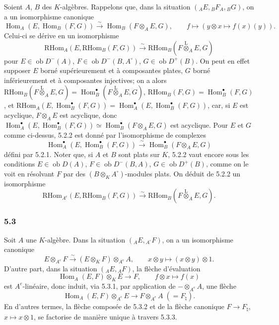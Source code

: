 \documentclass[11pt]{article}
\DeclareMathOperator{\Hom}{Hom}
\newcommand{\ob}{\operatorname{ob}}
\providecommand{\RHom}{\mathrm{RHom}}
\providecommand{\lten}{\overset{\mathrm L}{\otimes}}
\providecommand{\RHom}{\mathrm{RHom}}
\providecommand{\Hom}{\operatorname{Hom}}
\providecommand{\ob}{\operatorname{ob}}
\providecommand{\lten}{\overset{\mathrm L}{\otimes}}
\providecommand{\RHom}{\mathrm R\mathcal{H}om}
\providecommand{\lten}{\overset{\mathrm L}{\otimes}}
\providecommand{\lten}{\overset{\mathrm L}{\otimes}}
\providecommand{\lten}{\overset{\mathrm L}{\otimes}}
\providecommand{\lten}{\overset{\mathrm L}{\otimes}}
\providecommand{\RHom}{\mathrm{RHom}}
\providecommand{\Hom}{\operatorname{Hom}}
\providecommand{\lten}{\overset{\mathrm L}{\otimes}}
\begin{document}
Soient $A$, $B$ des $K$-algèbres. Rappelons que, dans la situation $({}_AE,{}_BF_A,{}_BG)$, on a un isomorphisme canonique
\begin{equation}\tag{5.2.1}
\Hom_A(E,\Hom_B(F,G))\xrightarrow{\sim}\Hom_B(F\otimes_AE,G),\qquad
f\longmapsto (y\otimes x\longmapsto f(x)(y)).
\end{equation}
Celui-ci se dérive en un isomorphisme
\begin{equation}\tag{5.2.2}
\RHom_A(E,\RHom_B(F,G))\xrightarrow{\sim}\RHom_B(F\lten_AE,G)
\end{equation}
pour $E\in\ob D^-(A)$, $F\in\ob D^-(B,A^\circ)$, $G\in\ob D^+(B)$. On peut en effet supposer $E$ borné supérieurement et à composantes plates, $G$ borné inférieurement et à composantes injectives; on a alors $\RHom_B(F\lten_AE,G)=\Hom_B^\bullet(F\lten_AE,G)$, $\RHom_B(F,G)=\Hom_B^\bullet(F,G)$, et $\RHom_A(E,\Hom_B^\bullet(F,G))=\Hom_A^\bullet(E,\Hom_B^\bullet(F,G))$, car, si $E$ est acyclique, $F\otimes_AE$ est acyclique, donc $\Hom_A^\bullet(E,\Hom_B^\bullet(F,G))\simeq\Hom_B^\bullet(F\otimes_AE,G)$ est acyclique. Pour $E$ et $G$ comme ci-dessus, 5.2.2 est donné par l'isomorphisme de complexes
\[
\Hom_A^\bullet(E,\Hom_B^\bullet(F,G))\xrightarrow{\sim}\Hom_B^\bullet(F\otimes_AE,G)
\]
défini par 5.2.1. Noter que, si $A$ et $B$ sont plats sur $K$, 5.2.2 vaut encore sous les conditions $E\in\ob D(A)$, $F\in\ob D^-(B,A)$, $G\in\ob D^+(B)$, comme on le voit en résolvant $F$ par des $(B\otimes_KA^\circ)$-modules plats. On déduit de 5.2.2 un isomorphisme
\begin{equation}\tag{5.2.3}
\RHom_{A^e}(E,\RHom_B(F,G))\xrightarrow{\sim}\RHom_B(F\lten_AE,G).
\end{equation}

\subsubsection*{5.3}

Soit $A$ une $K$-algèbre. Dans la situation $({}_AE,{}_{A^\circ}F)$, on a un isomorphisme canonique
\begin{equation}\tag{5.3.1}
E\otimes_{A^e}F\xrightarrow{\sim}(E\otimes_KF)\otimes_{A^e}A,
\qquad x\otimes y\longmapsto (x\otimes y)\otimes 1.
\end{equation}
D'autre part, dans la situation $({}_AE,{}_AF)$, la flèche d'évaluation
\begin{equation}\tag{5.3.2}
\Hom_A(E,F)\otimes_KE\longrightarrow F,
\qquad f\otimes x\longmapsto f(x)
\end{equation}
est $A^e$-linéaire, donc induit, via 5.3.1, par application de $-\otimes_{A^e}A$, une flèche
\begin{equation}\tag{5.3.3}
\Hom_A(E,F)\otimes_{A^e}E\longrightarrow F\otimes_{A^e}A\;(=F_\natural).
\end{equation}
En d'autres termes, la flèche composée de 5.3.2 et de la flèche canonique $F\to F_\natural$, $x\mapsto x\otimes 1$, se factorise de manière unique à travers 5.3.3.
\end{document}
